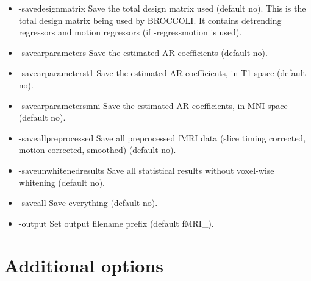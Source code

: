 \begin{itemize}
\item -savedesignmatrix          
\newline \newline Save the total design matrix used (default no). This is the total design matrix being used by BROCCOLI. It contains detrending regressors and motion regressors (if -regressmotion is used).

\item -savearparameters          
\newline \newline Save the estimated AR coefficients (default no). 

\item -savearparameterst1        
\newline \newline Save the estimated AR coefficients, in T1 space (default no). 

\item -savearparametersmni       
\newline \newline Save the estimated AR coefficients, in MNI space (default no). 

\item -saveallpreprocessed       
\newline \newline Save all preprocessed fMRI data  \newline (slice timing corrected, motion corrected, smoothed) (default no). 

\item -saveunwhitenedresults     
\newline \newline Save all statistical results without voxel-wise whitening (default no). 

\item -saveall                   
\newline \newline Save everything (default no). 

\item -output 
\newline \newline Set output filename prefix (default fMRI\_).

\end{itemize}

\newpage
\section{Additional options}

